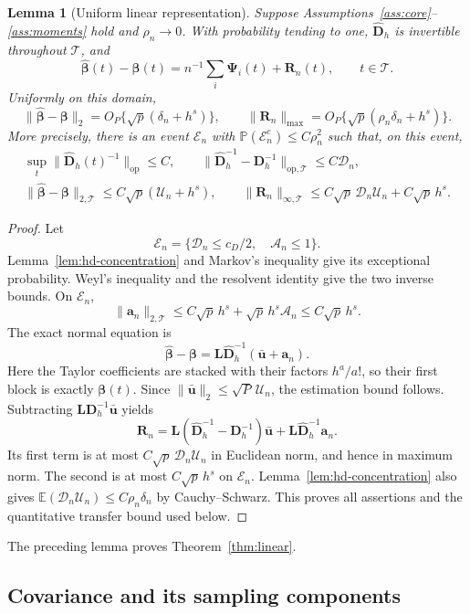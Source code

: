 \documentclass[12pt]{article}
\newtheorem{lemma}{Lemma}
\newcommand{\ba}{{\mathbf a}}
\newcommand{\bu}{{\mathbf u}}
\newcommand{\bD}{{\mathbf D}}
\newcommand{\bL}{{\mathbf L}}
\newcommand{\bR}{{\mathbf R}}
\newcommand{\bbeta}  {\boldsymbol{\beta}}
\newcommand{\bPsi} {\boldsymbol{\Psi}}
\newcommand{\expect}{\mathbb{E}}
\newcommand{\prob}{\mathbb{P}}
\numberwithin{equation}{section}
\begin{document}
\begin{lemma}[Uniform linear representation]\label{lem:hd-linear}
Suppose Assumptions~\ref{ass:core}--\ref{ass:moments} hold and
$\rho_n\to0$. With probability tending to one,
$\widehat{\bD}_h$ is invertible throughout $\mathcal T$, and
\[
\widehat{\bbeta}(t)-\bbeta(t)
=n^{-1}\sum_i\bPsi_i(t)+\bR_n(t),\qquad t\in\mathcal T.
\]
Uniformly on this domain,
\[
\|\widehat{\bbeta}-\bbeta\|_2
=O_P\{\sqrt p(\delta_n+h^s)\},\qquad
\|\bR_n\|_{\max}
=O_P\{\sqrt p(\rho_n\delta_n+h^s)\}.
\]
More precisely, there is an event $\mathcal E_n$ with
$\prob(\mathcal E_n^c)\le C\rho_n^2$ such that, on this event,
\[
\begin{gathered}
\sup_t\|\widehat{\bD}_h(t)^{-1}\|_{\mathrm{op}}\le C,\qquad
\|\widehat{\bD}_h^{-1}-\bD_h^{-1}\|_{\mathrm{op},\mathcal T}
\le C\mathcal D_n,\\
\|\widehat{\bbeta}-\bbeta\|_{2,\mathcal T}
\le C\sqrt p(\mathcal U_n+h^s),\qquad
\|\bR_n\|_{\infty,\mathcal T}
\le C\sqrt p\,\mathcal D_n\mathcal U_n+C\sqrt p\,h^s.
\end{gathered}
\]
\end{lemma}

\begin{proof}
Let
\[
\mathcal E_n=\{\mathcal D_n\le c_D/2,\quad \mathcal A_n\le1\}.
\]
Lemma~\ref{lem:hd-concentration} and Markov's inequality give its
exceptional probability.  Weyl's inequality and the resolvent
identity give the two inverse bounds.  On $\mathcal E_n$,
\[
\|\ba_n\|_{2,\mathcal T}
\le C\sqrt p\,h^s+\sqrt p\,h^s\mathcal A_n
\le C\sqrt p\,h^s.
\]
The exact normal equation is
\[
\widehat{\bbeta}-\bbeta
=\bL\widehat{\bD}_h^{-1}(\bar\bu+\ba_n).
\]
Here the Taylor coefficients are stacked with their factors
$h^a/a!$, so their first block is exactly $\bbeta(t)$.
Since $\|\bar\bu\|_2\le\sqrt P\,\mathcal U_n$, the estimation
bound follows.  Subtracting $\bL\bD_h^{-1}\bar\bu$ yields
\[
\bR_n=\bL(\widehat{\bD}_h^{-1}-\bD_h^{-1})\bar\bu
+\bL\widehat{\bD}_h^{-1}\ba_n.
\]
Its first term is at most $C\sqrt p\,\mathcal D_n\mathcal U_n$ in
Euclidean norm, and hence in maximum norm.  The second is at most
$C\sqrt p\,h^s$ on $\mathcal E_n$. Lemma~\ref{lem:hd-concentration}
also gives
$\expect(\mathcal D_n\mathcal U_n)\le C\rho_n\delta_n$
by Cauchy--Schwarz. This proves all assertions and the quantitative
transfer bound used below.
\end{proof}

The preceding lemma proves Theorem~\ref{thm:linear}.

\subsection{Covariance and its sampling components}\label{app:covariance-proof}
\end{document}
